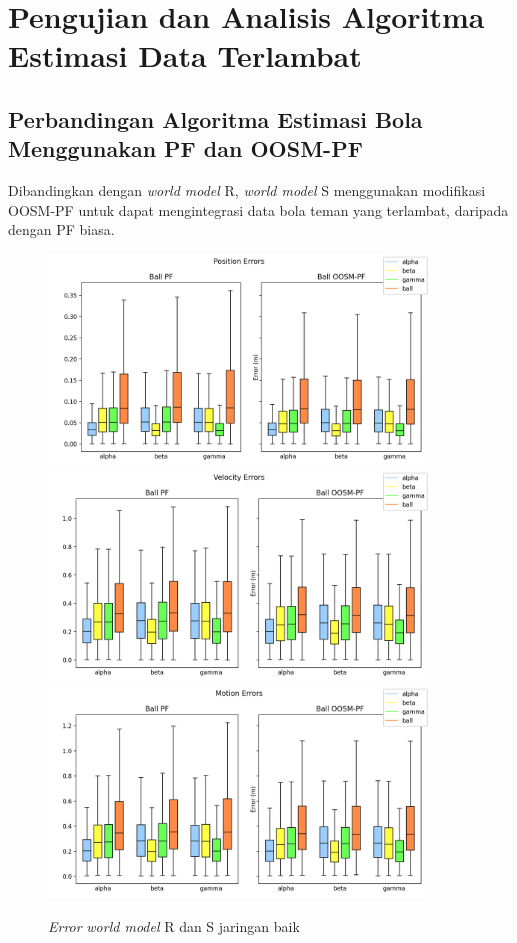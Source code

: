 \section{Pengujian dan Analisis Algoritma Estimasi Data Terlambat}

\subsection{Perbandingan Algoritma Estimasi Bola Menggunakan PF dan OOSM-PF}

Dibandingkan dengan \textit{world model} R, \textit{world model} S menggunakan modifikasi OOSM-PF untuk dapat mengintegrasi data bola teman yang terlambat, daripada dengan PF biasa.

\begin{figure}[p]
    \centering
    \medskip
    \includegraphics[width=0.9\textwidth]{resources/cfg1_AR_AS_error_pos.png}
    \includegraphics[width=0.9\textwidth]{resources/cfg1_AR_AS_error_vel.png}
    \includegraphics[width=0.9\textwidth]{resources/cfg1_AR_AS_error_motion.png}
    \caption{\textit{Error} \textit{world model} R dan S jaringan baik}
    \label{fig:1-r-s-error}
    \bigskip
\end{figure}

